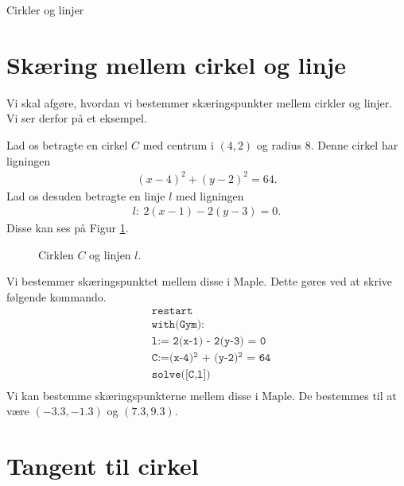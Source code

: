 \begin{center}
\Huge
Cirkler og linjer
\end{center}

\section*{Skæring mellem cirkel og linje}
Vi skal afgøre, hvordan vi bestemmer skæringspunkter mellem cirkler og linjer. Vi ser derfor på et eksempel.
\begin{exa}
	Lad os betragte en cirkel $C$ med centrum i $(4,2)$ og radius 8. Denne 
	cirkel har ligningen 
	\begin{align*}
		(x-4)^2 + (y-2)^2 = 64.
	\end{align*}
	Lad os desuden betragte en linje $l$ med ligningen
	\begin{align*}
		l: \ 2(x-1) -2(y-3) = 0. 
	\end{align*}
	Disse kan ses på Figur \ref{fig:cirkellinje}.
	\begin{figure}[H]
		\centering
		\caption{Cirklen $C$ og linjen $l$.}
		\label{fig:cirkellinje}
	\end{figure}
	Vi bestemmer skæringspunktet mellem disse i Maple. Dette gøres ved at skrive følgende kommando. 
	\begin{align*}
		&\texttt{restart}\\
		&\texttt{with(Gym):}\\
		&\texttt{l:= 2(x-1) - 2(y-3) = 0}\\
		&\texttt{C:=(x-4)$^\texttt{2}$ + (y-2)$^\texttt{2}$ = 64}\\
		&\texttt{solve([C,l])}\\
	\end{align*}
	Vi kan bestemme skæringspunkterne mellem disse i Maple. De bestemmes til at være $(-3.3, -1.3)$ og $(7.3,9.3)$. 
\end{exa}

\section*{Tangent til cirkel}


